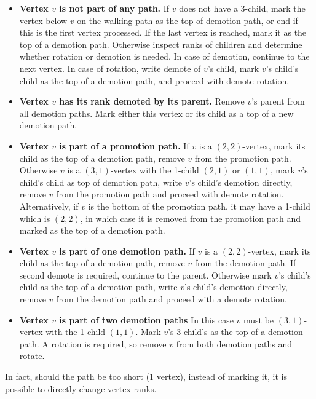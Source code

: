 \begin{itemize}

\item {\bfseries Vertex $v$ is not part of any path.} If $v$ does not have a 3-child, mark the vertex below $v$ on the walking path as the top of demotion path, or end if this is the first vertex processed. If the last vertex is reached, mark it as the top of a demotion path. Otherwise inspect ranks of children and determine whether rotation or demotion is needed. In case of demotion, continue to the next vertex. In case of rotation, write demote of $v$'s child, mark $v$'s child's child as the top of a demotion path, and proceed with demote rotation.

\item {\bfseries Vertex $v$ has its rank demoted by its parent.} Remove $v$'s parent from all demotion paths. Mark either this vertex or its child as a top of a new demotion path.

\item {\bfseries Vertex $v$ is part of a promotion path.} If $v$ is a $(2,2)$-vertex, mark its child as the top of a demotion path, remove $v$ from the promotion path. Otherwise $v$ is a $(3,1)$-vertex with the 1-child $(2,1)$ or $(1,1)$, mark $v$'s child's child as top of demotion path, write $v$'s child's demotion directly, remove $v$ from the promotion path and proceed with demote rotation. Alternatively, if $v$ is the bottom of the promotion path, it may have a 1-child which is $(2,2)$, in which case it is removed from the promotion path and marked as the top of a demotion path.

\item {\bfseries Vertex $v$ is part of one demotion path.} If $v$ is a $(2,2)$-vertex, mark its child as the top of a demotion path, remove $v$ from the demotion path. If second demote is required, continue to the parent. Otherwise mark $v$'s child's child as the top of a demotion path, write $v$'s child's demotion directly, remove $v$ from the demotion path and proceed with a demote rotation. 

\item {\bfseries Vertex $v$ is part of two demotion paths} In this case $v$ must be $(3,1)$-vertex with the 1-child $(1,1)$. Mark $v$'s 3-child's as the top of a demotion path. A rotation is required, so remove $v$ from both demotion paths and rotate.

\end{itemize}

In fact, should the path be too short (1 vertex), instead of marking it, it is possible to directly change vertex ranks.

